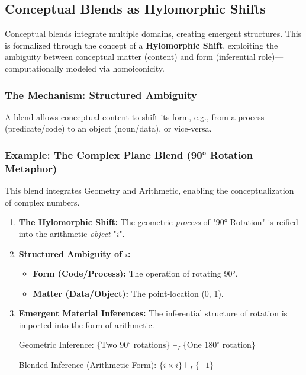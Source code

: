 \documentclass[12pt]{book}
\begin{document}
\subsection{Conceptual Blends as Hylomorphic Shifts}

Conceptual blends integrate multiple domains, creating emergent structures. This is formalized through the concept of a \textbf{Hylomorphic Shift}, exploiting the ambiguity between conceptual matter (content) and form (inferential role)—computationally modeled via homoiconicity.

\subsubsection{The Mechanism: Structured Ambiguity}

A blend allows conceptual content to shift its form, e.g., from a process (predicate/code) to an object (noun/data), or vice-versa.

\subsubsection{Example: The Complex Plane Blend (90° Rotation Metaphor)}

This blend integrates Geometry and Arithmetic, enabling the conceptualization of complex numbers.

\begin{enumerate}
    \item \textbf{The Hylomorphic Shift:}
    The geometric \textit{process} of "90° Rotation" is reified into the arithmetic \textit{object} "$i$".

    \item \textbf{Structured Ambiguity of $i$:}
    \begin{itemize}
        \item \textbf{Form (Code/Process):} The operation of rotating 90°.
        \item \textbf{Matter (Data/Object):} The point-location (0, 1).
    \end{itemize}

    \item \textbf{Emergent Material Inferences:}
    The inferential structure of rotation is imported into the form of arithmetic.
    
    Geometric Inference: 
    $\{\text{Two } 90^{\circ} \text{ rotations}\} \models_{I} \{\text{One } 180^{\circ} \text{ rotation}\}$
    
    Blended Inference (Arithmetic Form):
    $\{i \times i\} \models_{I} \{-1\}$

\end{enumerate}
\end{document}
